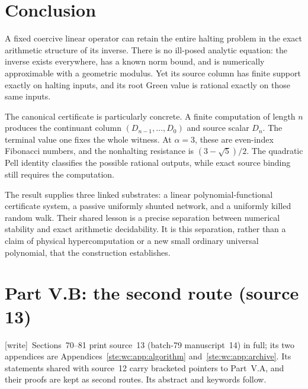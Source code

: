 \documentclass[11pt,letterpaper]{article}
\theoremstyle{definition}
\theoremstyle{remark}
\newcommand{\wtag}{\textup{[write]}}
\begin{document}
\section{Conclusion}
A fixed coercive linear operator can retain the entire halting problem in
the exact arithmetic structure of its inverse. There is no ill-posed
analytic equation: the inverse exists everywhere, has a known norm bound,
and is numerically approximable with a geometric modulus. Yet its
source column has finite support exactly on halting inputs, and its root
Green value is rational exactly on those same inputs.

The canonical certificate is particularly concrete. A finite computation
of length $n$ produces the continuant column
$(D_{n-1},\ldots,D_0)$ and source scalar $D_n$. The terminal value one
fixes the whole witness. At $\alpha=3$, these are even-index Fibonacci
numbers, and the nonhalting resistance is $(3-\sqrt5)/2$.
The quadratic Pell identity classifies the possible rational outputs,
while exact source binding still requires the computation.

The result supplies three linked substrates: a linear
polynomial-functional certificate system, a passive uniformly shunted
network, and a uniformly killed random walk. Their shared lesson is a
precise separation between numerical stability and exact arithmetic
decidability. It is this separation, rather than a claim of physical
hypercomputation or a new small ordinary universal polynomial, that the
construction establishes.

\section*{Part V.B: the second route (source 13)}

\noindent\wtag\ Sections~70--81 print source~13 (batch-79 manuscript~14) in full; its two appendices are Appendices~\ref{ste:wc:app:algorithm} and~\ref{ste:wc:app:archive}. Its statements shared with source~12 carry bracketed pointers to Part~V.A, and their proofs are kept as second routes. Its abstract and keywords follow.
\end{document}
